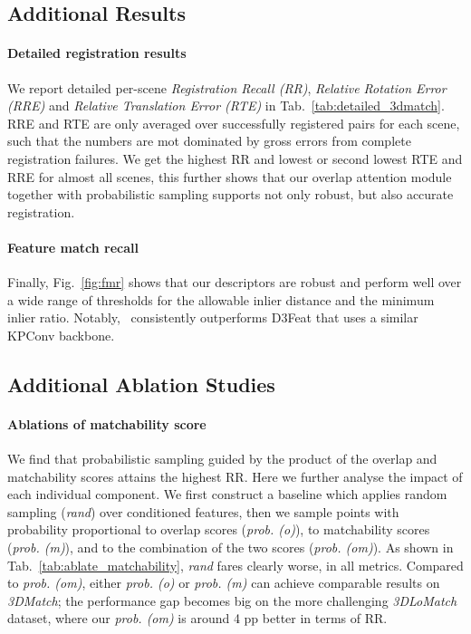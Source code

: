 
\subsection{Additional Results}
\label{sec:additional_results_supp}
\paragraph{Detailed registration results}
We report detailed per-scene \textit{Registration Recall (RR)}, \textit{Relative Rotation Error (RRE)} and \textit{Relative Translation Error (RTE)} in Tab.~\ref{tab:detailed_3dmatch}. RRE and RTE are only averaged over successfully registered pairs for each scene, such that the numbers are mot dominated by gross errors from complete registration failures. We get the highest RR and lowest or second lowest RTE and RRE for almost all scenes, this further shows that our overlap attention module together with probabilistic sampling supports not only robust, but also accurate registration.  


\paragraph{Feature match recall}
Finally, Fig.~\ref{fig:fmr} shows that our descriptors are robust and perform well over a wide range of thresholds for the allowable inlier distance and the minimum inlier ratio. Notably, \acro\ consistently outperforms D3Feat that uses a similar KPConv backbone.


\subsection{Additional Ablation Studies}
\label{sec:addtional_ablation_supp}


\paragraph{Ablations of matchability score}
We find that probabilistic sampling guided by the product of the overlap and matchability scores attains the highest RR. Here we further analyse the impact of each individual component. We first construct a baseline which applies random sampling (\textit{rand}) over conditioned features, then we sample points with probability proportional to overlap scores (\textit{prob. (o)}), to matchability scores (\textit{prob. (m)}), and to the combination of the two scores (\textit{prob. (om)}). As shown in Tab.~\ref{tab:ablate_matchability}, \textit{rand} fares clearly worse, in all metrics. Compared to \textit{prob. (om)}, either \textit{prob. (o)} or \textit{prob. (m)} can achieve comparable results on \emph{3DMatch}; the performance gap becomes big on the more challenging \emph{3DLoMatch} dataset, where our \textit{prob. (om)} is around 4 pp better in terms of RR. 

